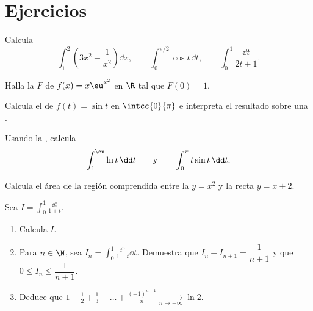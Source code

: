 \section{Ejercicios}

\begin{exercise}[$\star$]\label{exo:g12:integ:1}
Calcula
\[
\int_1^2 \left(3x^2 - \frac{1}{x^2}\right)\dd x, \qquad
\int_0^{\pi/2} \cos t \,\dd t, \qquad
\int_0^{1} \frac{\dd t}{2t+1} .
\]
\end{exercise}

\begin{exercise}[$\star$]\label{exo:g12:integ:2}
Halla la  $F$ de $f(x) = x\eu^{x^2}$ en $\R$ tal que $F(0) = 1$.
\end{exercise}

\begin{exercise}[$\star$]\label{exo:g12:integ:3}
Calcula el  de $f(t) = \sin t$ en $\intcc{0}{\pi}$ e interpreta
el resultado sobre una .
\end{exercise}

\begin{exercise}[$\star\star$]\label{exo:g12:integ:4}
Usando la , calcula
\[
\int_1^{\eu} \ln t\,\dd t
\qquad\text{y}\qquad
\int_0^{\pi} t \sin t\,\dd t .
\]
\end{exercise}

\begin{exercise}[$\star\star$]\label{exo:g12:integ:5}
Calcula el área de la región comprendida entre la  $y = x^2$ y la
recta $y = x + 2$.
\end{exercise}

\begin{exercise}[$\star\star$]\label{exo:g12:integ:6}
Sea $I = \displaystyle\int_0^1 \frac{\dd t}{1 + t}$.
\begin{enumerate}
  \item Calcula $I$.
  \item Para $n \in \N$, sea
        $I_n = \displaystyle\int_0^1 \frac{t^n}{1+t}\dd t$. Demuestra que
        $I_n + I_{n+1} = \dfrac{1}{n+1}$ y que
        $0 \leq I_n \leq \dfrac{1}{n+1}$.
  \item Deduce que
        $1 - \frac12 + \frac13 - \dots + \frac{(-1)^{n-1}}{n}
        \xrightarrow[n \to +\infty]{} \ln 2$.
\end{enumerate}
\end{exercise}

